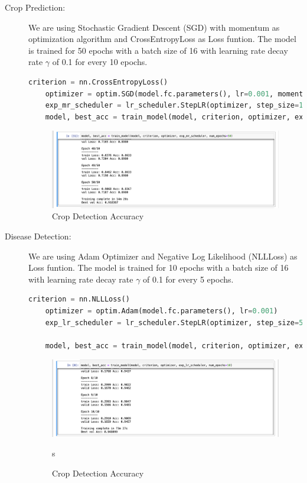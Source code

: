 \documentclass[../Report.tex]{subfiles}
\begin{document}
\begin{description}
  \item[Crop Prediction:] We are using Stochastic Gradient Descent (SGD) with momentum as optimization algorithm and CrossEntropyLoss as 
  Loss funtion. The model is trained for 50 epochs with a batch size of 16 with learning rate decay rate $\gamma$ of 0.1 for every 10 epochs.

  \begin{lstlisting}[language=python,caption={Disease Detection Image Pre-processing},captionpos=b]
    criterion = nn.CrossEntropyLoss()
    optimizer = optim.SGD(model.fc.parameters(), lr=0.001, momentum=0.9)
    exp_mr_scheduler = lr_scheduler.StepLR(optimizer, step_size=10, gamma=0.1)
    model, best_acc = train_model(model, criterion, optimizer, exp_mr_scheduler, num_epochs=50)
  \end{lstlisting}

  \begin{figure}[H]
    \centering
    \includegraphics[width=\linewidth]{images/crop_acc.png}
    \caption{Crop Detection Accuracy}
    \label{fig:crop_acc}
  \end{figure}

  \item[Disease Detection:] We are using Adam Optimizer and Negative Log Likelihood (NLLLoss) as Loss funtion. The model is trained for 
  10 epochs with a batch size of 16 with learning rate decay rate $\gamma$ of 0.1 for every 5 epochs.
  \begin{lstlisting}[language=python,caption={Disease Detection Image Pre-processing},captionpos=b]
    criterion = nn.NLLLoss()
    optimizer = optim.Adam(model.fc.parameters(), lr=0.001)
    exp_lr_scheduler = lr_scheduler.StepLR(optimizer, step_size=5, gamma=0.1)
    
    model, best_acc = train_model(model, criterion, optimizer, exp_lr_scheduler, num_epochs=10) 
  \end{lstlisting}

  \begin{figure}[H]
    \centering
    \includegraphics[width=\linewidth]{images/disease_acc.png}
    \caption{Crop Detection Accuracy}
    \label{fig:disease_acc}s
  \end{figure}


\end{description}
\end{document}
